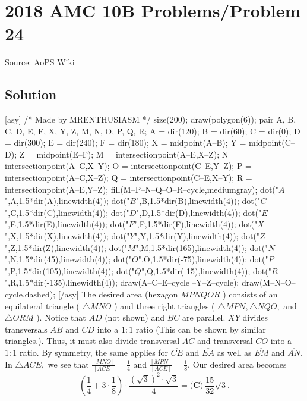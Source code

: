 \documentclass[12pt]{article}
\begin{document}
\section*{{2018 AMC 10B Problems/Problem 24}}
Source: AoPS Wiki

\subsection*{Solution}
[asy] /* Made by MRENTHUSIASM */ size(200); draw(polygon(6)); pair A, B, C, D, E, F, X, Y, Z, M, N, O, P, Q, R; A = dir(120); B = dir(60); C = dir(0); D = dir(300); E = dir(240); F = dir(180); X = midpoint(A--B); Y = midpoint(C--D); Z = midpoint(E--F); M = intersectionpoint(A--E,X--Z); N = intersectionpoint(A--C,X--Y); O = intersectionpoint(C--E,Y--Z); P = intersectionpoint(A--C,X--Z); Q = intersectionpoint(C--E,X--Y); R = intersectionpoint(A--E,Y--Z); fill(M--P--N--Q--O--R--cycle,mediumgray); dot("$A$",A,1.5*dir(A),linewidth(4)); dot("$B$",B,1.5*dir(B),linewidth(4)); dot("$C$",C,1.5*dir(C),linewidth(4)); dot("$D$",D,1.5*dir(D),linewidth(4)); dot("$E$",E,1.5*dir(E),linewidth(4)); dot("$F$",F,1.5*dir(F),linewidth(4)); dot("$X$",X,1.5*dir(X),linewidth(4)); dot("$Y$",Y,1.5*dir(Y),linewidth(4)); dot("$Z$",Z,1.5*dir(Z),linewidth(4)); dot("$M$",M,1.5*dir(165),linewidth(4)); dot("$N$",N,1.5*dir(45),linewidth(4)); dot("$O$",O,1.5*dir(-75),linewidth(4)); dot("$P$",P,1.5*dir(105),linewidth(4)); dot("$Q$",Q,1.5*dir(-15),linewidth(4)); dot("$R$",R,1.5*dir(-135),linewidth(4)); draw(A--C--E--cycle^^X--Y--Z--cycle); draw(M--N--O--cycle,dashed); [/asy] The desired area (hexagon $MPNQOR$ ) consists of an equilateral triangle ( $\triangle MNO$ ) and three right triangles ( $\triangle MPN,\triangle NQO,$ and $\triangle ORM$ ). Notice that $\overline {AD}$ (not shown) and $\overline {BC}$ are parallel. $\overline {XY}$ divides transversals $\overline {AB}$ and $\overline {CD}$ into a $1:1$ ratio (This can be shown by similar triangles.). Thus, it must also divide transversal $\overline {AC}$ and transversal $\overline {CO}$ into a $1:1$ ratio. By symmetry, the same applies for $\overline {CE}$ and $\overline {EA}$ as well as $\overline {EM}$ and $\overline {AN}.$ In $\triangle ACE,$ we see that $\frac{[MNO]}{[ACE]} = \frac{1}{4}$ and $\frac{[MPN]}{[ACE]} = \frac{1}{8}.$ Our desired area becomes \[\left(\frac{1}{4}+3 \cdot \frac{1}{8}\right) \cdot \frac{(\sqrt{3})^2 \cdot \sqrt{3}}{4} = \boxed{\textbf{(C)}\ \frac {15}{32}\sqrt{3}}.\]
\end{document}
